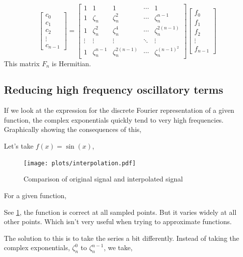 \documentclass[11pt]{amsart}
\theoremstyle{definition}
\theoremstyle{remark}
\numberwithin{equation}{section}
\begin{document}
\begin{equation}
	\begin{bmatrix}
		c_{0} \\
		c_{1} \\
		c_{2} \\
		\vdots \\
		c_{n-1} 
	\end{bmatrix}
	=
	\begin{bmatrix}
		1 & 1 & 1 & \cdots & 1 \\
		1 & \zeta_n & \zeta_n^2 & \cdots & \zeta_n^{n-1} \\
		1 & \zeta_n^2 & \zeta_n^4 & \cdots & \zeta_n^{2(n-1)} \\
		\vdots & \vdots & \vdots & \ddots & \vdots \\
		1 & \zeta_n^{n-1} & \zeta_n^{2(n-1)} & \cdots & \zeta_n^{(n-1)^2}
	\end{bmatrix}
	\begin{bmatrix}
		f_0 \\
		f_1 \\
		f_2 \\
		\vdots \\
		f_{n-1}
	\end{bmatrix}
	\label{matrixFourier}
\end{equation}
This matrix $F_n$ is Hermitian.

\subsection{Reducing high frequency oscillatory terms}
If we look at the expression for the discrete Fourier representation of a given function, the complex exponentials quickly tend to very high frequencies. Graphically showing the consequences of this, 

Let's take $f(x) = \sin(x)$,


\begin{figure}[!ht]
    \centering
    \texttt{[image: plots/interpolation.pdf]}
    \caption{Comparison of original signal and interpolated signal}
    \label{fig:dft_interpolation}
\end{figure}

For a given function,


See \ref{fig:dft_interpolation}, the function is correct at all sampled points.
But it varies widely at all other points. Which isn't very useful when trying to approximate functions.

The solution to this is to take the series a bit differently. Instead of taking the complex exponentials, $\zeta_n^0$ to $\zeta_n^{n-1}$, we take,
\end{document}
